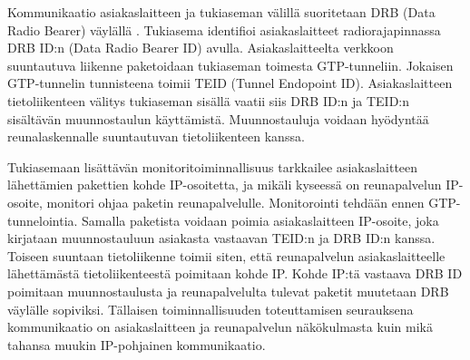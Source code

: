 Kommunikaatio asiakaslaitteen ja tukiaseman välillä suoritetaan DRB (Data Radio Bearer) väylällä .
Tukiasema identifioi asiakaslaitteet radiorajapinnassa DRB ID:n (Data Radio Bearer ID) avulla.
Asiakaslaitteelta verkkoon suuntautuva liikenne paketoidaan tukiaseman toimesta GTP-tunneliin. Jokaisen GTP-tunnelin tunnisteena toimii TEID (Tunnel Endopoint ID).
Asiakaslaitteen tietoliikenteen välitys tukiaseman sisällä vaatii siis DRB ID:n ja TEID:n sisältävän muunnostaulun käyttämistä.
Muunnostauluja voidaan hyödyntää reunalaskennalle suuntautuvan tietoliikenteen kanssa.

Tukiasemaan lisättävän monitoritoiminnallisuus tarkkailee asiakaslaitteen lähettämien pakettien kohde IP-osoitetta, ja mikäli kyseessä on reunapalvelun IP-osoite, monitori ohjaa paketin reunapalvelulle.
Monitorointi tehdään ennen GTP-tunnelointia.
Samalla paketista voidaan poimia asiakaslaitteen IP-osoite, joka kirjataan muunnostauluun asiakasta vastaavan TEID:n ja DRB ID:n kanssa.
Toiseen suuntaan tietoliikenne toimii siten, että reunapalvelun asiakaslaitteelle lähettämästä tietoliikenteestä poimitaan kohde IP.
Kohde IP:tä vastaava DRB ID poimitaan muunnostaulusta ja reunapalvelulta tulevat paketit muutetaan DRB väylälle sopiviksi.
Tällaisen toiminnallisuuden toteuttamisen seurauksena kommunikaatio on asiakaslaitteen ja reunapalvelun näkökulmasta kuin mikä tahansa muukin IP-pohjainen kommunikaatio.

